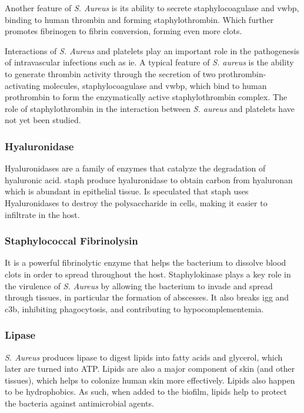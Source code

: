Another feature of \textit{S. Aureus} is its ability to secrete staphylocoagulase and \gls{vwbp}, binding to human thrombin and forming staphylothrombin. Which further promotes fibrinogen to fibrin conversion, forming even more clots.

Interactions of \textit{S. Aureus} and platelets play an important role in the pathogenesis of intravascular infections such as \gls{ie}. A typical feature of \textit{S. aureus} is the ability to generate thrombin activity through the secretion of two prothrombin-activating molecules, staphylocoagulase and \gls{vwbp}, which bind to human prothrombin to form the enzymatically active staphylothrombin complex. The role of staphylothrombin in the interaction between \textit{S. aureus} and platelets have not yet been studied. \cite{Vanassche2012}

\subsubsection{Hyaluronidase}

Hyaluronidases are a family of enzymes that catalyze the degradation of hyaluronic acid. \gls{staph} produce hyaluronidase to obtain carbon from hyaluronan which is abundant in epithelial tissue. Is speculated that \gls{staph} uses Hyaluronidases to destroy the polysaccharide in cells, making it easier to infiltrate in the host.

\subsubsection{Staphylococcal Fibrinolysin}

It is a powerful fibrinolytic enzyme that helps the bacterium to dissolve blood clots in order to spread throughout the host. Staphylokinase plays a key role in the virulence of \textit{S. Aureus} by allowing the bacterium to invade and spread through tissues, in particular the formation of abscesses. It also breaks \gls{igg} and \gls{c3b}, inhibiting phagocytosis, and contributing to hypocomplementemia.

\subsubsection{Lipase}

\textit{S. Aureus} produces lipase to digest lipids into fatty acids and glycerol, which later are turned into ATP. Lipids are also a major component of skin (and other tissues), which helps to colonize human skin more effectively. Lipids also happen to be hydrophobics. As such, when added to the biofilm, lipids help to protect the bacteria against antimicrobial agents.

